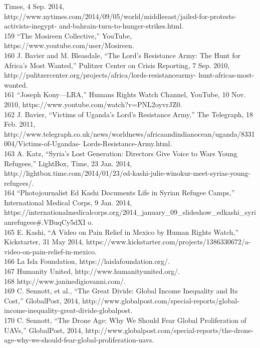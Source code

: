 Times, 4 Sep. 2014, http://www.nytimes.com/2014/09/05/world/middleeast/jailed-for-protests-activists-inegypt-
and-bahrain-turn-to-hunger-strikes.html.\\
159 ``The Mosireen Collective,'' YouTube, https://www.youtube.com/user/Mosireen.\\
160 J. Bavier and M. Bleasdale, ``The Lord’s Resistance Army: The Hunt for Africa’s Most Wanted,''
Pulitzer Center on Crisis Reporting, 7 Sep. 2010, http://pulitzercenter.org/projects/africa/lords-resistancearmy-
hunt-africas-most-wanted.\\
161 ``Joseph Kony—LRA,'' Humans Rights Watch Channel, YouTube, 10 Nov. 2010,
https://www.youtube.com/watch?v=PNL2oyvrJZ0.\\
162 J. Bavier, ``Victims of Uganda’s Lord’s Resistance Army,'' The Telegraph, 18 Feb. 2011,
http://www.telegraph.co.uk/news/worldnews/africaandindianocean/uganda/8331004/Victims-of-Ugandas-
Lords-Resistance-Army.html.\\
163 A. Katz, ``Syria’s Lost Generation: Directors Give Voice to Wars Young Refugees,'' LightBox, Time, 23
Jan. 2014, http://lightbox.time.com/2014/01/23/ed-kashi-julie-winokur-meet-syrias-young-refugees/.\\
164 ``Photojournalist Ed Kashi Documents Life in Syrian Refugee Camps,'' International Medical Corps, 9
Jan. 2014,
https://internationalmedicalcorps.org/2014_january_09_slideshow_edkashi_syrianrefugees#.VBuqCy5dXI
o.\\
165 E. Kashi, ``A Video on Pain Relief in Mexico by Human Rights Watch,'' Kickstarter, 31 May 2014,
https://www.kickstarter.com/projects/1386330672/a-video-on-pain-relief-in-mexico.\\
166 La Isla Foundation, https://laislafoundation.org/.\\
167 Humanity United, http://www.humanityunited.org/.\\
168 http://www.janinedigiovanni.com/.\\
169 C. Sennott, et al., ``The Great Divide: Global Income Inequality and Its Cost,'' GlobalPost, 2014,
http://www.globalpost.com/special-reports/global-income-inequality-great-divide-globalpost.\\
170 C. Sennott, ``The Drone Age: Why We Should Fear Global Proliferation of UAVs,'' GlobalPost, 2014,
http://www.globalpost.com/special-reports/the-drone-age-why-we-should-fear-global-proliferation-uavs.\\